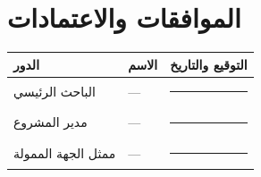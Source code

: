 \documentclass[11pt,a4paper]{article}
\begin{document}
\section{الموافقات والاعتمادات}
\label{sec:approvals}

\vspace{2em}
\begin{table}[H]
\centering
\renewcommand{\arraystretch}{2}
\begin{tabularx}{\textwidth}{L{4cm} L{5cm} X}
\toprule
\textbf{الدور} & \textbf{الاسم} & \textbf{التوقيع والتاريخ} \\
\midrule
الباحث الرئيسي & --- & \rule{6cm}{0.4pt} \\
مدير المشروع & --- & \rule{6cm}{0.4pt} \\
ممثل الجهة الممولة & --- & \rule{6cm}{0.4pt} \\
\bottomrule
\end{tabularx}
\end{table}
\end{document}
